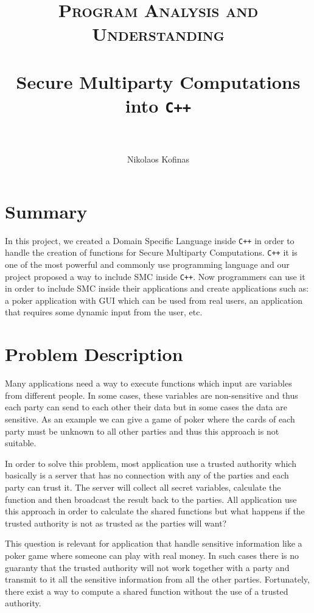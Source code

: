 \documentclass[paper=a4, fontsize=11pt]{scrartcl} %
\title{	
\vspace*{-2cm}
\normalfont \normalsize 
\textsc{Program Analysis and Understanding} \\ [10pt] %
\horrule{0.2pt} \\[0.2cm] %
\huge Secure Multiparty Computations into {\tt C++} \\ %
\horrule{2pt} \\[0.2cm] %
}
\author{Nikolaos Kofinas} %
\date{}%
\numberwithin{equation}{section} %
\numberwithin{figure}{section} %
\numberwithin{table}{section} %
\begin{document}
\maketitle %

\section{Summary}
In this project, we created a Domain Specific Language inside {\tt C++} in order to handle the creation of functions for Secure Multiparty Computations. {\tt C++} it is one of the most powerful and commonly use programming language and our project proposed a way to include SMC inside {\tt C++}. Now programmers can use it in order to include SMC inside their applications and create applications such as: a poker application with GUI which can be used from real users, an application that requires some dynamic input from the user, etc.

\section{Problem Description}
Many applications need a way to execute functions which input are variables from different people. In some cases, these variables are non-sensitive and thus each party can send to each other their data but in some cases the data are sensitive. As an example we can give a game of poker where the cards of each party must be unknown to all other parties and thus this approach is not suitable. 

In order to solve this problem, most application use a trusted authority which basically is a server that has no connection with any of the parties and  each party can trust it. The server will collect all secret variables, calculate the function and then broadcast the result back to the parties. All application use this approach in order to calculate the shared functions but what happens if the trusted authority is not as trusted as the parties will want? 

This question is relevant for application that handle sensitive information like a poker game where someone can play with real money. In such cases there is no guaranty that the trusted authority will not work together with a party and transmit to it all the sensitive information from all the other parties. Fortunately, there exist a way to compute a shared function without the use of a trusted authority. 
\end{document}
